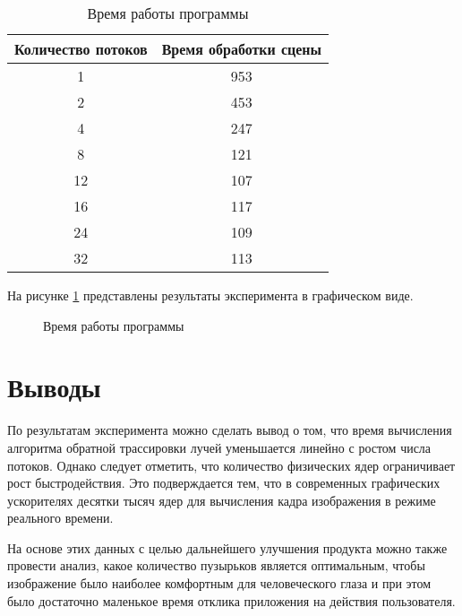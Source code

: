 \begin{table}[h!]
	\begin{center}
		\caption{\label{tabular:time}Время работы программы}
		\begin{tabular}{|c|c|}
			\hline
			Количество потоков &  Время обработки сцены \\\hline
				1 & 953\\\hline
				2 & 453\\\hline
				4 & 247\\\hline
				8 & 121\\\hline
				12 & 107\\\hline
				16 & 117\\\hline
				24 & 109\\\hline
				32 & 113\\\hline
		\end{tabular}
	\end{center}
\end{table}

На рисунке \ref{plt:time} представлены результаты эксперимента в графическом виде.

\begin{figure}[h]
	\centering
	\captionsetup{justification=centering}
	\caption{Время работы программы}
	\label{plt:time}
\end{figure}


\captionsetup{singlelinecheck = false, justification=centering}

\section{Выводы}

По результатам эксперимента можно сделать вывод о том, что время вычисления алгоритма обратной трассировки лучей уменьшается линейно с ростом числа потоков. Однако следует отметить, что количество физических ядер ограничивает рост быстродействия. Это подверждается тем, что в современных графических ускорителях десятки тысяч ядер для вычисления кадра изображения в режиме реального времени. 

На основе этих данных с целью дальнейшего улучшения продукта можно также провести анализ, какое количество пузырьков является оптимальным, чтобы изображение было наиболее комфортным для человеческого глаза и при этом было достаточно маленькое время отклика приложения на действия пользователя.



